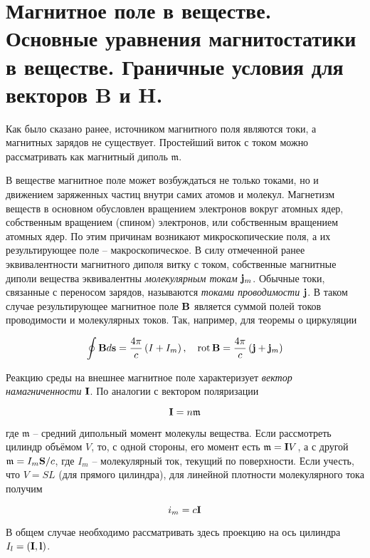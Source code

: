 \section{Магнитное поле в веществе. Основные уравнения магнитостатики в веществе. Граничные условия для векторов B и H.}

Как было сказано ранее, источником магнитного поля являются токи, а магнитных зарядов не существует. Простейший виток с током можно рассматривать как магнитный диполь $\mathfrak{m}$.

В веществе магнитное поле может возбуждаться не только токами, но и движением заряженных частиц внутри самих атомов и молекул. Магнетизм веществ в основном обусловлен вращением электронов вокруг атомных ядер, собственным вращением (спином) электронов, или собственным вращением атомных ядер. По этим причинам возникают микроскопические поля, а их результирующее поле -- макроскопическое. В силу отмеченной ранее эквивалентности магнитного диполя витку с током, собственные магнитные диполи вещества эквивалентны \textit{молекулярным токам} $\mathbf j_m$. Обычные токи, связанные с переносом зарядов, называются \textit{токами проводимости} $\mathbf j$. В таком случае результирующее магнитное поле $\mathbf B$ является суммой полей токов проводимости и молекулярных токов. Так, например, для теоремы о циркуляции

\begin{align}
    \oint \mathbf B d \mathbf s &= \frac{4 \pi}{c} \left( I + I_m \right), & \, \text{rot} \, \mathbf B = \frac{4 \pi}{c} \left( \mathbf j + \mathbf j_m \right)
\end{align}

Реакцию среды на внешнее магнитное поле характеризует \textit{вектор намагниченности} $\mathbf I$. По аналогии с вектором поляризации

\begin{equation}
    \mathbf I = n \mathfrak{m}
\end{equation}

\noindent
где $\mathfrak{m}$ -- средний дипольный момент молекулы вещества. Если рассмотреть цилиндр объёмом $V$, то, с одной стороны, его момент есть $\mathfrak{m} = \mathbf I V$, а с другой $\mathfrak{m} = I_m \mathbf S / c$, где $I_m$ -- молекулярный ток, текущий по поверхности. Если учесть, что $V = S L$ (для прямого цилиндра), для линейной плотности молекулярного тока получим

\begin{equation}
    i_m = c \mathbf I
\end{equation}

\noindent
В общем случае необходимо рассматривать здесь проекцию на ось цилиндра $I_l = \left( \mathbf I, \mathbf l \right)$.

